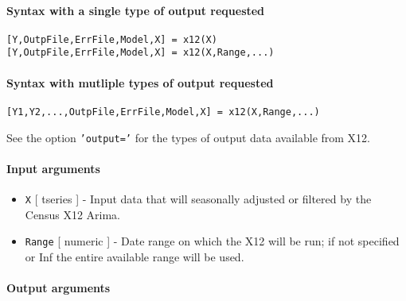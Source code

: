 


	\paragraph{Syntax with a single type of output
requested}\label{syntax-with-a-single-type-of-output-requested}

\begin{verbatim}
[Y,OutpFile,ErrFile,Model,X] = x12(X)
[Y,OutpFile,ErrFile,Model,X] = x12(X,Range,...)
\end{verbatim}

\paragraph{Syntax with mutliple types of output
requested}\label{syntax-with-mutliple-types-of-output-requested}

\begin{verbatim}
[Y1,Y2,...,OutpFile,ErrFile,Model,X] = x12(X,Range,...)
\end{verbatim}

See the option \texttt{'output='} for the types of output data available
from X12.

\paragraph{Input arguments}\label{input-arguments}

\begin{itemize}
\item
  \texttt{X} {[} tseries {]} - Input data that will seasonally adjusted
  or filtered by the Census X12 Arima.
\item
  \texttt{Range} {[} numeric {]} - Date range on which the X12 will be
  run; if not specified or Inf the entire available range will be used.
\end{itemize}

\paragraph{Output arguments}\label{output-arguments}

